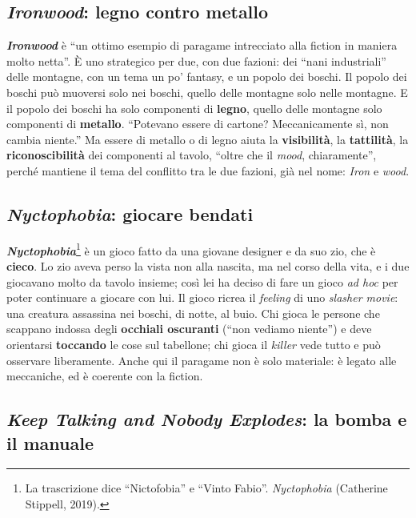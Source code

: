 \subsection{\emph{Ironwood}: legno contro metallo}



\textbf{\emph{Ironwood}} è ``un ottimo esempio di paragame intrecciato alla fiction in maniera molto
netta''. È uno strategico per due, con due fazioni: dei ``nani industriali'' delle
montagne, con un tema un po' fantasy, e un popolo dei boschi. Il popolo dei boschi può
muoversi solo nei boschi, quello delle montagne solo nelle montagne. E il popolo dei
boschi ha solo componenti di \textbf{legno}, quello delle montagne solo componenti di
\textbf{metallo}. ``Potevano essere di cartone? Meccanicamente sì, non cambia niente.''
Ma essere di metallo o di legno aiuta la \textbf{visibilità}, la \textbf{tattilità}, la
\textbf{riconoscibilità} dei componenti al tavolo, ``oltre che il \emph{mood},
chiaramente'', perché mantiene il tema del conflitto tra le due fazioni, già nel nome:
\emph{Iron} e \emph{wood}.

\subsection{\emph{Nyctophobia}: giocare bendati}



\textbf{\emph{Nyctophobia}}\footnote{La trascrizione dice ``Nictofobia'' e ``Vinto
Fabio''. \emph{Nyctophobia} (Catherine Stippell, 2019).} è un gioco fatto da una giovane
designer e da suo zio, che è \textbf{cieco}. Lo zio aveva perso la vista non alla
nascita, ma nel corso della vita, e i due giocavano molto da tavolo insieme; così lei ha
deciso di fare un gioco \emph{ad hoc} per poter continuare a giocare con lui. Il gioco
ricrea il \emph{feeling} di uno \emph{slasher movie}: una creatura assassina nei boschi,
di notte, al buio. Chi gioca le persone che scappano indossa degli \textbf{occhiali
oscuranti} (``non vediamo niente'') e deve orientarsi \textbf{toccando} le cose sul
tabellone; chi gioca il \emph{killer} vede tutto e può osservare liberamente. Anche qui il
paragame non è solo materiale: è legato alle meccaniche, ed è coerente con la fiction.

\subsection{\emph{Keep Talking and Nobody Explodes}: la bomba e il manuale}

